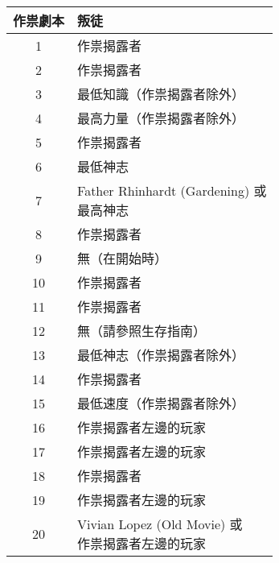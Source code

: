 \begin{center}
	\begin{minipage}[t]{.45\textwidth}
		\renewcommand{\arraystretch}{1.5}
		\begin{tabular}[t]{ c l }
			\toprule
			\bfseries 作祟劇本 & \bfseries 叛徒                                 \\[.5ex]
			\midrule
			1              & 作祟揭露者                                        \\
			2              & 作祟揭露者                                        \\
			3              & 最低知識（作祟揭露者除外）                                \\
			4              & 最高力量（作祟揭露者除外）                                \\
			5              & 作祟揭露者                                        \\

			6              & 最低神志                                         \\
			7              & \makecell[tl]{Father Rhinhardt (Gardening) 或 \\ 最高神志} \\
			8              & 作祟揭露者                                        \\
			9              & 無（在開始時）                                      \\
			10             & 作祟揭露者                                        \\

			11             & 作祟揭露者                                        \\
			12             & 無（請參照生存指南）                                   \\
			13             & 最低神志（作祟揭露者除外）                                \\
			14             & 作祟揭露者                                        \\
			15             & 最低速度（作祟揭露者除外）                                \\

			16             & 作祟揭露者左邊的玩家                                   \\
			17             & 作祟揭露者左邊的玩家                                   \\
			18             & 作祟揭露者                                        \\
			19             & 作祟揭露者左邊的玩家                                   \\
			20             & \makecell[tl]{Vivian Lopez (Old Movie) 或     \\ 作祟揭露者左邊的玩家} \\


\end{tabular}
\end{minipage}
\end{center}
